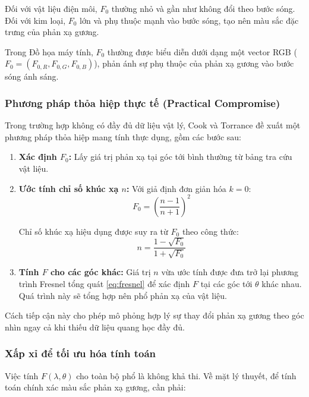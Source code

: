 Đối với vật liệu điện môi, $F_0$ thường nhỏ và gần như không đổi theo bước sóng. Đối với kim loại, $F_0$ lớn và phụ thuộc mạnh vào bước sóng, tạo nên màu sắc đặc trưng của phản xạ gương.

Trong Đồ họa máy tính, $F_0$ thường được biểu diễn dưới dạng một vector RGB ($F_0 = (F_{0, R}, F_{0, G}, F_{0, B})$), phản ánh sự phụ thuộc của phản xạ gương vào bước sóng ánh sáng.

\subsubsection{Phương pháp thỏa hiệp thực tế (Practical Compromise)}

Trong trường hợp không có đầy đủ dữ liệu vật lý, Cook và Torrance đề xuất một phương pháp thỏa hiệp mang tính thực dụng, gồm các bước sau:

\begin{enumerate}
	\item \textbf{Xác định $F_0$:} Lấy giá trị phản xạ tại góc tới bình thường từ bảng tra cứu vật liệu.
	
	\item \textbf{Ước tính chỉ số khúc xạ $n$:} Với giả định đơn giản hóa $k = 0$:
	\begin{equation}
		F_0 = \left(\frac{n - 1}{n + 1}\right)^2
	\end{equation}
	
	Chỉ số khúc xạ hiệu dụng được suy ra từ $F_0$ theo công thức:
	\begin{equation}
		n = \frac{1 - \sqrt{F_0}}{1 + \sqrt{F_0}}
	\end{equation}
	
	\item \textbf{Tính $F$ cho các góc khác:} Giá trị $n$ vừa ước tính được đưa trở lại phương trình Fresnel tổng quát \eqref{eq:fresnel} để xác định $F$ tại các góc tới $\theta$ khác nhau. Quá trình này sẽ tổng hợp nên phổ phản xạ của vật liệu.
\end{enumerate}

Cách tiếp cận này cho phép mô phỏng hợp lý sự thay đổi phản xạ gương theo góc nhìn ngay cả khi thiếu dữ liệu quang học đầy đủ.

\subsubsection{Xấp xỉ để tối ưu hóa tính toán}

Việc tính $F(\lambda, \theta)$ cho toàn bộ phổ là không khả thi. Về mặt lý thuyết, để tính toán chính xác màu sắc phản xạ gương, cần phải:

